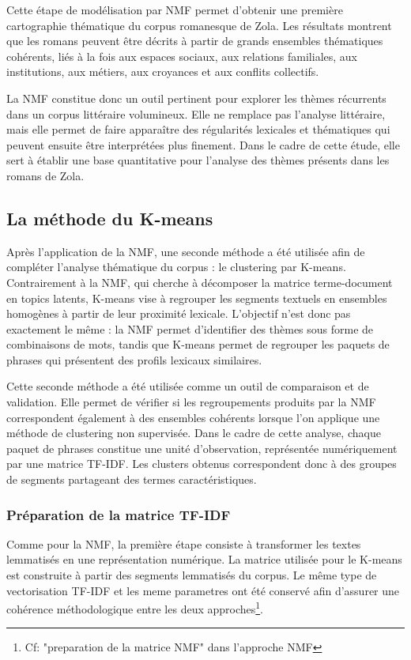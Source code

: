 \documentclass{article}
\begin{document}
Cette étape de modélisation par NMF permet d’obtenir une première cartographie thématique du corpus romanesque de Zola. Les résultats montrent que les romans peuvent être décrits à partir de grands ensembles thématiques cohérents, liés à la fois aux espaces sociaux, aux relations familiales, aux institutions, aux métiers, aux croyances et aux conflits collectifs.

La NMF constitue donc un outil pertinent pour explorer les thèmes récurrents dans un corpus littéraire volumineux. Elle ne remplace pas l’analyse littéraire, mais elle permet de faire apparaître des régularités lexicales et thématiques qui peuvent ensuite être interprétées plus finement. Dans le cadre de cette étude, elle sert à établir une base quantitative pour l’analyse des thèmes présents dans les romans de Zola.

\subsection{La méthode du K-means}

Après l'application de la NMF, une seconde méthode a été utilisée afin de compléter l'analyse thématique du corpus : le clustering par K-means. Contrairement à la NMF, qui cherche à décomposer la matrice terme-document en topics latents, K-means vise à regrouper les segments textuels en ensembles homogènes à partir de leur proximité lexicale. L'objectif n'est donc pas exactement le même : la NMF permet d'identifier des thèmes sous forme de combinaisons de mots, tandis que K-means permet de regrouper les paquets de phrases qui présentent des profils lexicaux similaires.

Cette seconde méthode a été utilisée comme un outil de comparaison et de validation. Elle permet de vérifier si les regroupements produits par la NMF correspondent également à des ensembles cohérents lorsque l'on applique une méthode de clustering non supervisée. Dans le cadre de cette analyse, chaque paquet de phrases constitue une unité d'observation, représentée numériquement par une matrice TF-IDF. Les clusters obtenus correspondent donc à des groupes de segments partageant des termes caractéristiques.

\subsubsection{Préparation de la matrice TF-IDF}

Comme pour la NMF, la première étape consiste à transformer les textes lemmatisés en une représentation numérique. La matrice utilisée pour le K-means est construite à partir des segments lemmatisés du corpus. Le même type de vectorisation TF-IDF et les meme parametres ont été conservé afin d'assurer une cohérence méthodologique entre les deux approches\footnote{Cf: "preparation de la matrice NMF" dans l'approche NMF}.
\end{document}
